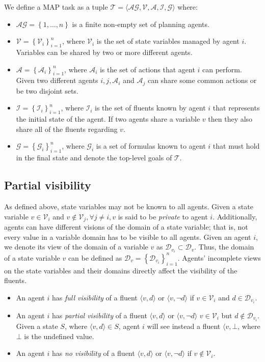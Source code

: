 \documentclass[12pt]{article}
\begin{document}
We define a MAP task as a tuple $\mathcal{T} = \langle \mathcal{AG}, \mathcal{V}, \mathcal{A}, \mathcal{I}, \mathcal{G} \rangle$ where:
\begin{itemize}
  \item $\mathcal{AG} = \left\{1, \ldots, n\right\}$ is a finite non-empty set of planning agents.
  \item $\mathcal{V} = \left\{\mathcal{V}_i\right\}^n_{i=1}$, where $\mathcal{V}_i$ is the set of state variables managed by agent $i$.
Variables can be shared by two or more different agents.
  \item $\mathcal{A} = \left\{\mathcal{A}_i\right\}^n_{i=1}$, where $\mathcal{A}_i$ is the set of actions that agent $i$ can perform.
Given two different agents $i, j, \mathcal{A}_i$ and $\mathcal{A}_j$ can share some common actions or be two disjoint sets.
  \item $\mathcal{I} = \left\{\mathcal{I}_i\right\}^n_{i=1}$, where $\mathcal{I}_i$ is the set of fluents known by agent $i$ that represents the initial state of the agent.
If two agents share a variable $v$ then they also share all of the fluents regarding $v$.
  \item $\mathcal{G} = \left\{\mathcal{G}_i\right\}^n_{i=1}$, where $\mathcal{G}_i$ is a set of formulas known to agent $i$ that must hold in the final state and denote the top-level goals of $\mathcal{T}$.
\end{itemize}

\subsection{Partial visibility}

As defined above, state variables may not be known to all agents.
Given a state variable $v \in \mathcal{V}_i$ and $v \notin \mathcal{V}_j, \forall j \neq i, v$ is said to be \textit{private} to agent $i$.
Additionally, agents can have different visions of the domain of a state variable; that is, not every value in a variable domain has to be visible to all agents.
Given an agent $i$, we denote its view of the domain of a variable $v$ as $\mathcal{D}_{v_i} \subset \mathcal{D}_v$.
Thus, the domain of a state variable $v$ can be defined as $\mathcal{D}_v = \left\{\mathcal{D}_{v_i}\right\}^n_{i=1}$.
Agents’ incomplete views on the state variables and their domains directly affect the visibility of the fluents.

\begin{itemize}
  \item An agent $i$ has \textit{full visibility} of a fluent $\langle v,d\rangle$ or $\langle v,\neg d\rangle$ if $v \in \mathcal{V}_i$ and $d \in \mathcal{D}_{v_i}$.
  \item An agent $i$ has \textit{partial visibility} of a fluent $\langle v,d\rangle$ or $\langle v,\neg d\rangle$ $v \in \mathcal{V}_i$ but $d \notin \mathcal{D}_{v_i}$.
Given a state $S$, where $\langle v,d\rangle \in S$, agent $i$ will see instead a fluent $\langle v, \bot$, where $\bot$ is the undefined value.
  \item An agent $i$ has \textit{no visibility} of a fluent $\langle v,d\rangle$ or $\langle v,\neg d\rangle$ if $v \notin \mathcal{V}_i$.
\end{itemize}
\end{document}
